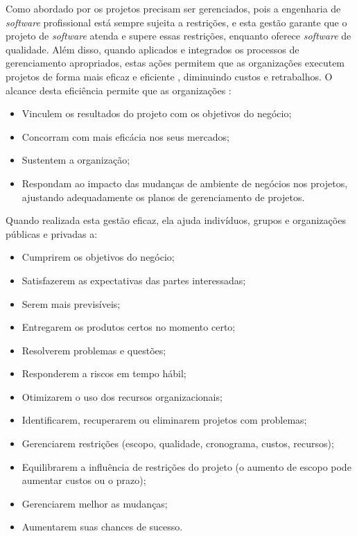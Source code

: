 \documentclass[
	12pt,
	openright,
	twoside,
	a4paper,
	english,
	brazil
	]{abntex2}
\begin{document}
Como abordado por  os projetos precisam ser gerenciados, pois a engenharia de \textit{software} profissional está sempre sujeita a restrições, e esta gestão garante que o projeto de \textit{software} atenda e supere essas restrições, enquanto oferece \textit{software} de qualidade. Além disso, quando aplicados e integrados os processos de gerenciamento apropriados, estas ações permitem que as organizações executem projetos de forma mais eficaz e eficiente \cite{PMBOK}, diminuindo custos e retrabalhos. O alcance desta eficiência permite que as organizações \cite{PMBOK}:

\begin{itemize}
  \item Vinculem os resultados do projeto com os objetivos do negócio;
  \item Concorram com mais eficácia nos seus mercados;
  \item Sustentem a organização;
  \item Respondam ao impacto das mudanças de ambiente de negócios nos projetos, ajustando adequadamente os planos de gerenciamento de projetos.
\end{itemize}
Quando realizada esta gestão eficaz, ela ajuda indivíduos, grupos e organizações públicas e privadas a:

\begin{itemize}
  \item Cumprirem os objetivos do negócio;
  \item Satisfazerem as expectativas das partes interessadas;
  \item Serem mais previsíveis;
  \item Entregarem os produtos certos no momento certo;
  \item Resolverem problemas e questões;
  \item Responderem a riscos em tempo hábil;
  \item Otimizarem o uso dos recursos organizacionais;
  \item Identificarem, recuperarem ou eliminarem projetos com problemas;
  \item Gerenciarem restrições (escopo, qualidade, cronograma, custos, recursos);
  \item Equilibrarem a influência de restrições do projeto (o aumento de escopo pode aumentar custos ou o prazo);
  \item Gerenciarem melhor as mudanças;
  \item Aumentarem suas chances de sucesso.
\end{itemize}
\end{document}
